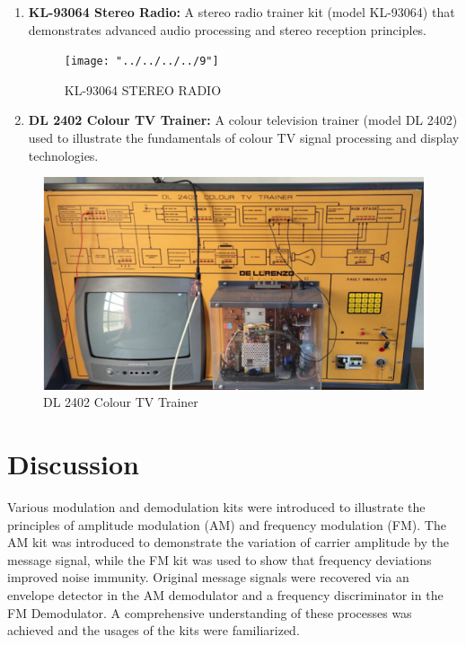 \documentclass[a4paper,12pt]{article}
\begin{document}
\begin{enumerate}
			\item \textbf{KL-93064 Stereo Radio:} A stereo radio trainer kit (model KL-93064) that demonstrates advanced audio processing and stereo reception principles.
				\begin{figure}[H]
				\centering
				\texttt{[image: "../../../../9"]}
				\caption{KL-93064 STEREO RADIO}
				
			\end{figure}
			
			
			
			
			
			
			
			\item \textbf{DL 2402 Colour TV Trainer:} A colour television trainer (model DL 2402) used to illustrate the fundamentals of colour TV signal processing and display technologies.
		\end{enumerate}
			\begin{figure}[H]
			\centering
			\includegraphics[width=.8\linewidth, height=0.3\textheight]{screenshot001}
			\caption{DL 2402 Colour TV Trainer}
			
		\end{figure}

\section{Discussion}
Various modulation and demodulation kits were introduced to illustrate the principles of amplitude modulation (AM) and frequency modulation (FM). The AM kit was introduced to demonstrate the variation of carrier amplitude by the message signal, while the FM kit was used to show that frequency deviations improved noise immunity. Original message signals were recovered via an envelope detector in the AM demodulator and a frequency discriminator in the FM Demodulator. A comprehensive understanding of these processes was achieved and the usages of the kits were familiarized.


	
	
		
	
		
		
		
		
	
		
		
		
		
		
		
		
	
		
	
		
		
		
		
		
		
	
	
\end{document}

